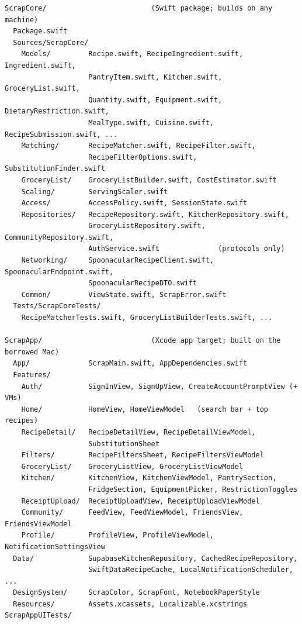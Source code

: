 {\footnotesize
\begin{verbatim}
ScrapCore/                         (Swift package; builds on any machine)
  Package.swift
  Sources/ScrapCore/
    Models/         Recipe.swift, RecipeIngredient.swift, Ingredient.swift,
                    PantryItem.swift, Kitchen.swift, GroceryList.swift,
                    Quantity.swift, Equipment.swift, DietaryRestriction.swift,
                    MealType.swift, Cuisine.swift, RecipeSubmission.swift, ...
    Matching/       RecipeMatcher.swift, RecipeFilter.swift,
                    RecipeFilterOptions.swift, SubstitutionFinder.swift
    GroceryList/    GroceryListBuilder.swift, CostEstimator.swift
    Scaling/        ServingScaler.swift
    Access/         AccessPolicy.swift, SessionState.swift
    Repositories/   RecipeRepository.swift, KitchenRepository.swift,
                    GroceryListRepository.swift, CommunityRepository.swift,
                    AuthService.swift              (protocols only)
    Networking/     SpoonacularRecipeClient.swift, SpoonacularEndpoint.swift,
                    SpoonacularRecipeDTO.swift
    Common/         ViewState.swift, ScrapError.swift
  Tests/ScrapCoreTests/
    RecipeMatcherTests.swift, GroceryListBuilderTests.swift, ...

ScrapApp/                          (Xcode app target; built on the borrowed Mac)
  App/              ScrapMain.swift, AppDependencies.swift
  Features/
    Auth/           SignInView, SignUpView, CreateAccountPromptView (+ VMs)
    Home/           HomeView, HomeViewModel   (search bar + top recipes)
    RecipeDetail/   RecipeDetailView, RecipeDetailViewModel,
                    SubstitutionSheet
    Filters/        RecipeFiltersSheet, RecipeFiltersViewModel
    GroceryList/    GroceryListView, GroceryListViewModel
    Kitchen/        KitchenView, KitchenViewModel, PantrySection,
                    FridgeSection, EquipmentPicker, RestrictionToggles
    ReceiptUpload/  ReceiptUploadView, ReceiptUploadViewModel
    Community/      FeedView, FeedViewModel, FriendsView, FriendsViewModel
    Profile/        ProfileView, ProfileViewModel, NotificationSettingsView
  Data/             SupabaseKitchenRepository, CachedRecipeRepository,
                    SwiftDataRecipeCache, LocalNotificationScheduler, ...
  DesignSystem/     ScrapColor, ScrapFont, NotebookPaperStyle
  Resources/        Assets.xcassets, Localizable.xcstrings
ScrapAppUITests/
\end{verbatim}
}

